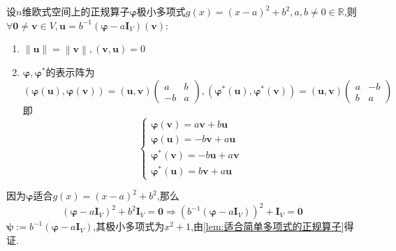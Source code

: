 \begin{green}
    \begin{lemma}[适合一般多项式的正规算子]\label{lem:适合一般多项式的正规算子}
        设$n$维欧式空间上的正规算子$\bm{\varphi}$极小多项式$g\left(x\right)=\left(x-a\right)^2+b^2,a,b\neq0\in\mathbb{R}$,则$\forall\bm{0}\neq\bm{v}\in V,\bm{u}=b^{-1}\left(\bm{\varphi}-a\bm{I}_V\right)\left(\bm{v}\right):$
        \begin{enumerate}[label={\textup{(\arabic*)}}]
            \item $\left\lVert\bm{u}\right\rVert=\left\lVert\bm{v}\right\rVert,\left(
                \bm{v},\bm{u}
            \right)=0$
            \item $\bm{\varphi},\bm{\varphi}^*$的表示阵为\[
            \left(
                \bm{\varphi}\left(\bm{u}\right),\bm{\varphi}\left(\bm{v}\right)
            \right)=\left(\bm{u},\bm{v}\right)\begin{pmatrix}
                a&b\\
                -b&a
            \end{pmatrix},\left(
                \bm{\varphi}^*\left(\bm{u}\right),\bm{\varphi}^*\left(\bm{v}\right)
            \right)=\left(\bm{u},\bm{v}\right)\begin{pmatrix}
                a&-b\\
                b&a
            \end{pmatrix}
            \]即\[
            \begin{cases*}
                \bm{\varphi}\left(\bm{v}\right)=a\bm{v}+b\bm{u}\\
                \bm{\varphi}\left(\bm{u}\right)=-b\bm{v}+a\bm{u}\\
                \bm{\varphi}^*\left(\bm{v}\right)=-b\bm{u}+a\bm{v}\\
                \bm{\varphi}^*\left(\bm{u}\right)=b\bm{v}+a\bm{u}
            \end{cases*}
            \]
        \end{enumerate}
    \end{lemma}
    \begin{Proof}
        因为$\bm{\varphi}$适合$g\left(x\right)=\left(x-a\right)^2+b^2$,那么\[
        \left(
            \bm{\varphi}-a\bm{I}_V
        \right)^2+b^2\bm{I}_V=\bm{0}\Longrightarrow\left(
            b^{-1}\left(
                \bm{\varphi}-a\bm{I}_V
            \right)
        \right)^2+\bm{I}_V=\bm{0}
        \]$\bm{\psi}:=b^{-1}\left(\bm{\varphi}-a\bm{I}_V\right)$,其极小多项式为$x^2+1$,由\cref{lem:适合简单多项式的正规算子}得证.
    \end{Proof}
\end{green}
